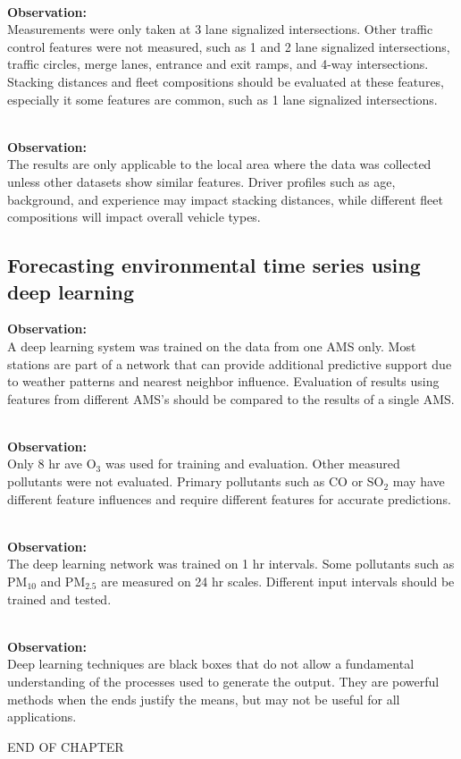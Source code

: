 \noindent\\
\textbf{Observation:}\\
Measurements were only taken at 3 lane signalized intersections. Other traffic control features were not measured, such as 1 and 2 lane signalized intersections, traffic circles, merge lanes, entrance and exit ramps, and 4-way intersections.  Stacking distances and fleet compositions should be evaluated at these features, especially it some features are common, such as 1 lane signalized intersections.

\clearpage

\noindent\\
\textbf{Observation:}\\
The results are only applicable to the local area where the data was collected unless other datasets show similar features. Driver profiles such as age, background, and experience may impact stacking distances, while different fleet compositions will impact overall vehicle types.

\subsection*{Forecasting environmental time series using deep learning}
\noindent
\textbf{Observation:}\\
A deep learning system was trained on the data from one AMS only. Most stations are part of a network that can provide additional predictive support due to weather patterns and nearest neighbor influence. Evaluation of results using features from different AMS's should be compared to the results of a single AMS.

\noindent\\
\textbf{Observation:}\\
Only 8 hr ave O$_{3}$ was used for training and evaluation. Other measured pollutants were not evaluated. Primary pollutants such as CO or SO$_{2}$  may have different feature influences and require different features for accurate predictions.

\noindent\\
\textbf{Observation:}\\
The deep learning network was trained on 1 hr intervals. Some pollutants such as PM$_{10}$ and PM$_{2.5}$ are measured on 24 hr scales. Different input intervals should be trained and tested.

\noindent\\
\textbf{Observation:}\\
Deep learning techniques are black boxes that do not allow a fundamental understanding of the processes used to generate the output. They are powerful methods when the ends justify the means, but may not be useful for all applications.

\bigskip

\begin{center}
END OF CHAPTER
\end{center}